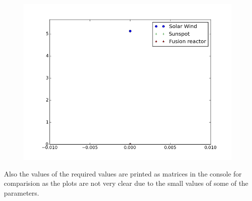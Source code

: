 \documentclass[11pt, a4paper]{article}
\begin{document}
\begin{figure}[H]
 \centering
 \includegraphics[width = \textwidth]{q1_4.png}
\end{figure}
Also the values of the required values are printed as matrices in the console for comparision as the plots are not very clear due to the small values of some of the parameters.
\end{document}
